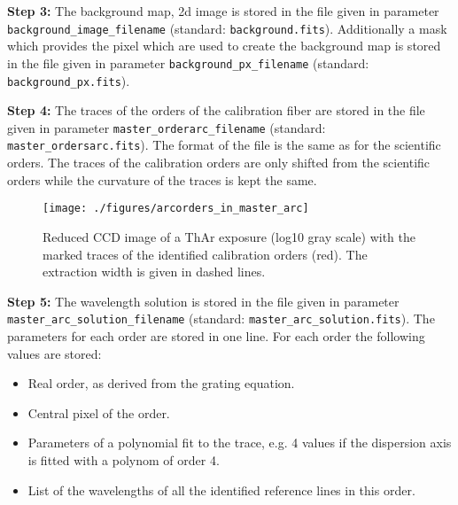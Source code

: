 \documentclass[10pt,a4paper]{article}
\begin{document}
\noindent \textbf{Step 3:} The background map, 2d image is stored in the file given in parameter \verb|background_image_filename| (standard: \verb|background.fits|). Additionally a mask which provides the pixel which are used to create the background map is stored in the file given in parameter \verb|background_px_filename| (standard: \verb|background_px.fits|).

\noindent \textbf{Step 4:} The traces of the orders of the calibration fiber are stored in the file given in parameter \verb|master_orderarc_filename| (standard: \verb|master_ordersarc.fits|). The format of the file is the same as for the scientific orders. The traces of the calibration orders are only shifted from the scientific orders while the curvature of the traces is kept the same.

\begin{figure} 
  \begin{center}
    \texttt{[image: ./figures/arcorders\_in\_master\_arc]}
  \end{center} 
  \caption{Reduced CCD image of a ThAr exposure (log10 gray scale) with the marked traces of the identified calibration orders (red). The extraction width is given in dashed lines.
    \label{figure_arcorders_in_master_arc}}
\end{figure}



\noindent \textbf{Step 5:} The wavelength solution is stored in the file given in parameter \verb|master_arc_solution_filename| (standard: \verb|master_arc_solution.fits|). The parameters for each order are stored in one line. For each order the following values are stored:
\begin{itemize}
  \item Real order, as derived from the grating equation.
  \item Central pixel of the order.
  \item Parameters of a polynomial fit to the trace, e.g. 4 values if the dispersion axis is fitted with a polynom of order 4.
  \item List of the wavelengths of all the identified reference lines in this order.
\end{itemize}
\end{document}
